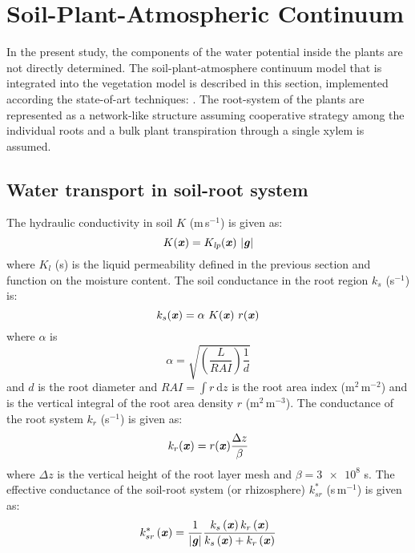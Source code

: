 \section{Soil-Plant-Atmospheric Continuum}
\label{sec:spac}

In the present study, the components of the water potential inside the plants are not directly determined. The soil-plant-atmosphere continuum model that is integrated into the vegetation model is described in this section, implemented according the state-of-art techniques: \citep{Volpe2013,Manoli2014,Launiainen2015,Idso1977,Manzoni2011,Farquhar1980}. The root-system of the plants are represented as a network-like structure assuming cooperative strategy among the individual roots and a bulk plant transpiration through a single xylem is assumed.

\subsection{Water transport in soil-root system}

The hydraulic conductivity in soil $K$ (m\,s$^{-1}$) is given as:
\begin{equation}
K(\textbf{\textit{x}}) = K_{\textit{lp}}(\textbf{\textit{x}}) ~ |\textbf{\textit{g}}|
\end{equation}
where $K_l$ (s) is the liquid permeability defined in the previous section and function on the moisture content. The soil conductance in the root region $k_s$ (s$^{-1}$) is:
\begin{equation}
k_s(\textbf{\textit{x}}) = \alpha ~ K(\textbf{\textit{x}}) ~ r(\textbf{\textit{x}})
\end{equation}
where $\alpha$ is 
\begin{equation}
\alpha =  \sqrt{\left(\frac{L}{\textit{RAI}}\right) \frac{1}{d}}
\end{equation}
and $d$ is the root diameter and $\textit{RAI} = \int r~\mathrm{d}z$ is the root area index (m$^2$\,m$^{-2}$) and is the vertical integral of the root area density $r$ (m$^{2}$\,m$^{-3}$). The conductance of the root system $k_r$ (s$^{-1}$) is given as:
\begin{equation}
k_r(\textbf{\textit{x}}) = r(\textbf{\textit{x}})\frac{\Delta z}{\beta}
\end{equation}
where $\Delta z$ is the vertical height of the root layer mesh and $\beta = \num{3e8}$ s. The effective conductance of the soil-root system (or rhizosphere) $k_{sr}^*$ (s\,m$^{-1}$) is given as:
\begin{equation}
k_{sr}^*\left(\textbf{\textit{x}}\right)  = \frac{1}{|\textbf{\textit{g}}|} \frac{k_s\left(\textbf{\textit{x}}\right)  k_r\left(\textbf{\textit{x}}\right) }{k_s\left(\textbf{\textit{x}}\right)  + k_r\left(\textbf{\textit{x}}\right) }
\end{equation}

